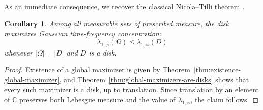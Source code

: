 \documentclass[a4paper,11pt,reqno]{amsart}
\numberwithin{equation}{section}
\theoremstyle{plain} %
\newtheorem{corollary}{Corollary}[section]
\theoremstyle{definition} %
\theoremstyle{remark}
\newcommand{\C}{\mathbb{C}}
\begin{document}
As an immediate consequence, we recover the classical Nicola--Tilli theorem
\cite{Nicola-Tilli, Nicola-Tilli-2}.

\begin{corollary}
Among all measurable sets of prescribed measure, the disk maximizes Gaussian
time-frequency concentration:
\[
\lambda_{1,\varphi}(\Omega)\le \lambda_{1,\varphi}(D)
\]
whenever \(|\Omega|=|D|\) and \(D\) is a disk.
\end{corollary}

\begin{proof}
Existence of a global maximizer is given by
Theorem~\ref{thm:existence-global-maximizer}, and
Theorem~\ref{thm:global-maximizers-are-disks} shows that every such
maximizer is a disk, up to translation. Since translation by an element of
\(\C\) preserves both Lebesgue measure and the value of
\(\lambda_{1,\varphi}\), the claim follows.
\end{proof}





\end{document}
